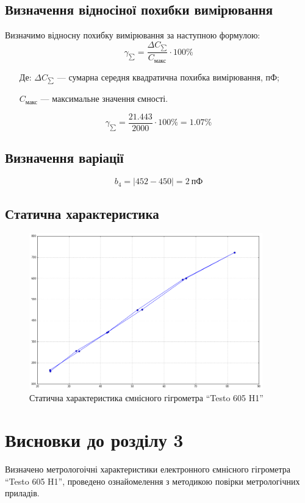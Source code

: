 \subsection{Визначення відносіної похибки вимірювання}
Визначимо відносну похибку вимірювання за наступною формулою:
\begin{equation}
    \gamma_{\sum} = \frac{\Delta C_{\sum}}{C_{\text{макс}}} \cdot 100\%
\end{equation}
\begin{itemize}
\item [Де:] $\Delta C_{\sum}$ --- сумарна середня квадратична похибка вимірювання, пФ;
\item []$C_{\text{макс}}$ ---  максимальне значення ємності.
\end{itemize}
\begin{equation}
    \gamma_{\sum} = \frac{21.443}{2000} \cdot 100\%= 1.07\%
\end{equation}

\subsection{Визначення варіації}
\begin{equation}
    b_4 = |452 - 450| = 2~\text{пФ}
\end{equation}
\subsection{Статична характеристика}

\begin{figure}[!h] \centering
  \includegraphics[width=0.9\textwidth]{./images/plot.png}
  \caption{Статична характеристика ємнісного гігрометра ``Testo 605 H1''}
  \label{fig:building}
\end{figure}

\newpage
\section*{Висновки до розділу 3}

Визначено метрологоічні характеристики електронного ємнісного гігрометра ``Testo 605 H1'', проведено
ознайомелення з методикою повірки метрологічних приладів.
